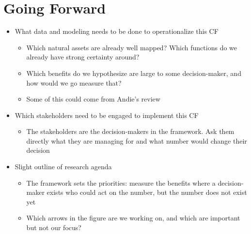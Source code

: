 \documentclass[12pt]{article}
\begin{document}
\section{Going Forward}\label{sec:next}
\begin{itemize}
  \item What data and modeling needs to be done to operationalize this CF 
  \begin{itemize}
    \item Which natural assets are already well mapped? Which functions do we already have strong certainty around?
    \item Which benefits do we hypothesize are large to some decision-maker, and how would we go measure that?
    \item Some of this could come from Andie's review
  \end{itemize}
  \item Which stakeholders need to be engaged to implement this CF
  \begin{itemize}
    \item The stakeholders are the decision-makers in the framework. Ask them directly what they are managing for and what number would change their decision
  \end{itemize}
  \item Slight outline of research agenda 
  \begin{itemize}
    \item The framework sets the priorities: measure the benefits where a decision-maker exists who could act on the number, but the number does not exist yet
    \item Which arrows in the figure are we working on, and which are important but not our focus?
  \end{itemize}
\end{itemize}



\newpage


\end{document}
